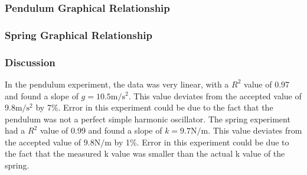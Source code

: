 \documentclass[10pt]{beamer}
\begin{document}
\begin{frame}
    \frametitle{Pendulum Graphical Relationship}
    \centering
\end{frame}

\begin{frame}
    \frametitle{Spring Graphical Relationship}
    \centering
\end{frame}

\begin{frame}
    \frametitle{Discussion}
    In the pendulum experiment, the data was very linear, with a $R^2$ value of
    0.97 and found a slope of $g = 10.5\si{\meter\per\second\squared}$. This
    value deviates from the accepted value of
    $9.8\si{\meter\per\second\squared}$ by 7\%. Error in this experiment could
    be due to the fact that the pendulum was not a perfect simple harmonic
    oscillator. The spring experiment had a $R^2$ value of 0.99 and found a
    slope of $k = 9.7\si{\newton\per\meter}$. This value deviates from the
    accepted value of $9.8\si{\newton\per\meter}$ by 1\%. Error in this
    experiment could be due to the fact that the measured k value was smaller
    than the actual k value of the spring.
\end{frame}
\end{document}

